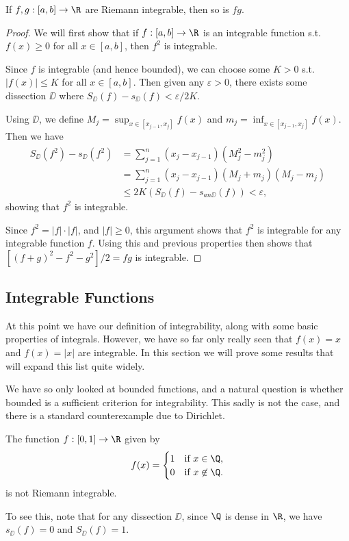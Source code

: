 \begin{proposition}
	If $f, g : [a, b] \rightarrow \R$ are Riemann integrable, then so is $fg$.
\end{proposition}
\begin{proof}
	We will first show that if $f: [a, b ]\rightarrow \R$ is an integrable function s.t. $f(x) \geq 0$ for all $x \in [a, b]$, then $f^2$ is integrable. 
	
	Since $f$ is integrable (and hence bounded), we can choose some  $K > 0$ s.t. $|f(x)| \leq K$ for all $x \in [a, b]$. Then given any $\varepsilon> 0$, there exists some dissection $\DD$ where $S_{\DD}(f) - s_{\DD}(f) < \varepsilon/2K$.

	Using $\DD$, we define $M_j = \sup_{x \in [x_{j - 1}, x_j]} f(x)$ and $m_j = \inf_{x \in [x_{j - 1}, x_j]} f(x)$. Then we have
	\begin{align*}
		S_\DD(f^2) - s_{\DD}(f^2) &= \sum_{j = 1}^{n} (x_{j} - x_{j - 1}) (M_j^2 - m_j^2) \\
		&= \sum_{j = 1}^{n} (x_{j} - x_{j - 1}) (M_j + m_j) (M_j - m_j)  \\
		&\leq  2K (S_\DD(f) - s_{an\DD}(f)) < \varepsilon,
	\end{align*}
	showing that $f^2$ is integrable.

	Since $f^2 = |f| \cdot |f|$, and $|f| \geq 0$, this argument shows that $f^2$ is integrable for any integrable function $f$.
	Using this and previous properties then shows that $[(f + g)^2 - f^2 - g^2]/2 = fg$ is integrable.
\end{proof}

\subsection{Integrable Functions}

At this point we have our definition of integrability, along with some basic properties of integrals. However, we have so far only really seen that $f(x) = x$ and $f(x) = |x|$ are integrable. In this section we will prove some results that will expand this list quite widely.

We have so only looked at bounded functions, and a natural question is whether bounded is a sufficient criterion for integrability.
This sadly is not the case, and there is a standard counterexample due to Dirichlet.

\begin{example}
The function $f:[0, 1] \rightarrow \R$ given by
$$
f(x) = \begin{cases}
	1 &\mbox{if } x \in \Q, \\
	0 &\mbox{if } x \not\in \Q.
	\end{cases}
$$
is not Riemann integrable.

To see this, note that for any dissection $\DD$, since $\Q$ is dense in $\R$, we have $s_{\DD}(f) = 0$ and $S_{\DD}(f) = 1$.
 \end{example}


